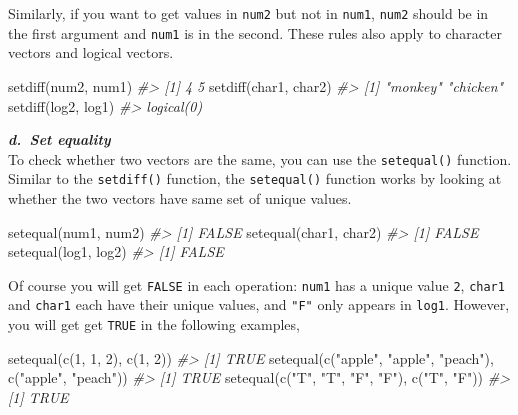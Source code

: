 \documentclass[
]{book}
\newenvironment{Shaded}{\begin{snugshade}}{\end{snugshade}}
\newcommand{\CommentTok}[1]{\textcolor[rgb]{0.56,0.35,0.01}{\textit{#1}}}
\newcommand{\DecValTok}[1]{\textcolor[rgb]{0.00,0.00,0.81}{#1}}
\newcommand{\FunctionTok}[1]{\textcolor[rgb]{0.00,0.00,0.00}{#1}}
\newcommand{\NormalTok}[1]{#1}
\newcommand{\StringTok}[1]{\textcolor[rgb]{0.31,0.60,0.02}{#1}}
\begin{document}
Similarly, if you want to get values in \texttt{num2} but not in \texttt{num1}, \texttt{num2} should be in the first argument and \texttt{num1} is in the second. These rules also apply to character vectors and logical vectors.

\begin{Shaded}
\begin{Highlighting}[]
\FunctionTok{setdiff}\NormalTok{(num2, num1)}
\CommentTok{\#\textgreater{} [1] 4 5}
\FunctionTok{setdiff}\NormalTok{(char1, char2)}
\CommentTok{\#\textgreater{} [1] "monkey"  "chicken"}
\FunctionTok{setdiff}\NormalTok{(log2, log1)}
\CommentTok{\#\textgreater{} logical(0)}
\end{Highlighting}
\end{Shaded}

\textbf{\emph{d.~Set equality}}\\
To check whether two vectors are the same, you can use the \texttt{setequal()} function. Similar to the \texttt{setdiff()} function, the \texttt{setequal()} function works by looking at whether the two vectors have same set of unique values.

\begin{Shaded}
\begin{Highlighting}[]
\FunctionTok{setequal}\NormalTok{(num1, num2)}
\CommentTok{\#\textgreater{} [1] FALSE}
\FunctionTok{setequal}\NormalTok{(char1, char2)}
\CommentTok{\#\textgreater{} [1] FALSE}
\FunctionTok{setequal}\NormalTok{(log1, log2)}
\CommentTok{\#\textgreater{} [1] FALSE}
\end{Highlighting}
\end{Shaded}

Of course you will get \texttt{FALSE} in each operation: \texttt{num1} has a unique value \texttt{2}, \texttt{char1} and \texttt{char1} each have their unique values, and \texttt{"F"} only appears in \texttt{log1}. However, you will get get \texttt{TRUE} in the following examples,

\begin{Shaded}
\begin{Highlighting}[]
\FunctionTok{setequal}\NormalTok{(}\FunctionTok{c}\NormalTok{(}\DecValTok{1}\NormalTok{, }\DecValTok{1}\NormalTok{, }\DecValTok{2}\NormalTok{), }\FunctionTok{c}\NormalTok{(}\DecValTok{1}\NormalTok{, }\DecValTok{2}\NormalTok{))}
\CommentTok{\#\textgreater{} [1] TRUE}
\FunctionTok{setequal}\NormalTok{(}\FunctionTok{c}\NormalTok{(}\StringTok{"apple"}\NormalTok{, }\StringTok{"apple"}\NormalTok{, }\StringTok{"peach"}\NormalTok{), }\FunctionTok{c}\NormalTok{(}\StringTok{"apple"}\NormalTok{, }\StringTok{"peach"}\NormalTok{))}
\CommentTok{\#\textgreater{} [1] TRUE}
\FunctionTok{setequal}\NormalTok{(}\FunctionTok{c}\NormalTok{(}\StringTok{"T"}\NormalTok{, }\StringTok{"T"}\NormalTok{, }\StringTok{"F"}\NormalTok{, }\StringTok{"F"}\NormalTok{), }\FunctionTok{c}\NormalTok{(}\StringTok{"T"}\NormalTok{, }\StringTok{"F"}\NormalTok{))}
\CommentTok{\#\textgreater{} [1] TRUE}
\end{Highlighting}
\end{Shaded}
\end{document}

